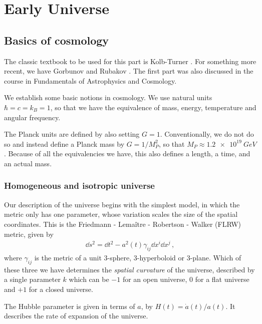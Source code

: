 \documentclass[main.tex]{subfiles}
\begin{document}
\chapter{Early Universe}

\section{Basics of cosmology}


The classic textbook to be used for this part is Kolb-Turner \cite[]{kolbEarlyUniverse1994}.
For something more recent, we have Gorbunov and Rubakov \cite[]{gorbunovIntroductionTheoryEarly2011}.
The first part was also discussed in the course in Fundamentals of Astrophysics and Cosmology.

We establish some basic notions in cosmology. We use natural units \(\hbar = c = k_B = 1\), so that we have the equivalence of mass, energy, temperature and angular frequency. 

The Planck units are defined by also setting \(G =1\). 
Conventionally, we do not do so and instead define a Planck mass by \(G = 1 / M_P^2\), so that \(M_P \approx \SI{1.2e19}{GeV}\).
Because of all the equivalencies we have, this also defines a length, a time, and an actual mass. 

\subsection{Homogeneous and isotropic universe}

Our description of the universe begins with the simplest model, in which the metric only has one parameter, whose variation scales the size of the spatial coordinates. This is the Friedmann - Lemaître - Robertson - Walker (FLRW) metric, given by 
%
\begin{align}
\dd{s^2} = \dd{t}^2  - a^2(t) \gamma_{ij} \dd{x^{i}} \dd{x^{j}}
\,,
\end{align}
%
where \(\gamma_{ij}\) is the metric of a unit 3-sphere, 3-hyperboloid or 3-plane.
Which of these three we have determines the \emph{spatial curvature} of the universe, described by a single parameter \(k\) which can be \(-1\) for an open universe, \(0\) for a flat universe and \(+1\) for a closed universe.

The Hubble parameter is given in terms of \(a\), by \(H(t) = \dot{a}(t) / a(t)\). It describes the rate of expansion of the universe.
\end{document}
